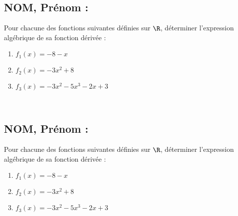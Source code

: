 \documentclass[a4paper,11pt,exos]{nsi} %
\begin{document}
\subsection*{NOM, Prénom : \dotfill} 


\maketitle




\begin{exercice}
    Pour chacune des fonctions suivantes définies sur $\R$, déterminer l'expression algébrique de sa fonction dérivée :
    \begin{multicols}{3}
        \begin{enumerate}
            \item $f_1(x)=-8-x$
        
            \item $f_2(x)= -3x^2+8$
            \item $f_3(x)= -3x^2-5x^3-2x+3$
        \end{enumerate}
    \end{multicols}
    
    \end{exercice}

\\



\subsection*{NOM, Prénom : \dotfill} 


\maketitle




\begin{exercice}
    Pour chacune des fonctions suivantes définies sur $\R$, déterminer l'expression algébrique de sa fonction dérivée :
    \begin{multicols}{3}
        \begin{enumerate}
            \item $f_1(x)=-8-x$
        
            \item $f_2(x)= -3x^2+8$
            \item $f_3(x)= -3x^2-5x^3-2x+3$
        \end{enumerate}
    \end{multicols}
    
    \end{exercice}

\end{document}
